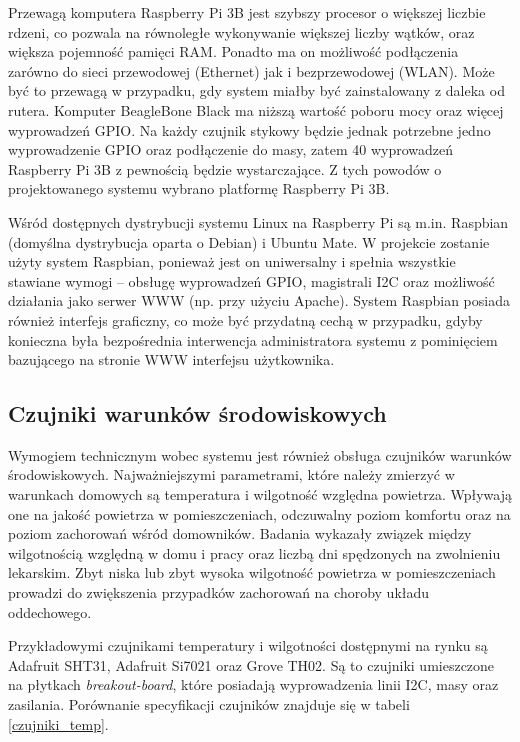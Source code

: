 \documentclass[a4paper,11pt,twoside]{article}
\begin{document}
Przewagą komputera Raspberry Pi 3B jest szybszy procesor o większej liczbie rdzeni, co pozwala na równoległe wykonywanie większej liczby wątków, oraz większa pojemność pamięci RAM. Ponadto ma on możliwość podłączenia zarówno do sieci przewodowej (Ethernet) jak i bezprzewodowej (WLAN). Może być to przewagą w przypadku, gdy system miałby być zainstalowany z daleka od rutera. Komputer BeagleBone Black ma niższą wartość poboru mocy oraz więcej wyprowadzeń GPIO. Na każdy czujnik stykowy będzie jednak potrzebne jedno wyprowadzenie GPIO oraz podłączenie do masy, zatem 40 wyprowadzeń Raspberry Pi 3B z pewnością będzie wystarczające. Z tych powodów o projektowanego systemu wybrano platformę Raspberry Pi 3B.

Wśród dostępnych dystrybucji systemu Linux na Raspberry Pi są m.in. Raspbian (domyślna dystrybucja oparta o Debian) i Ubuntu Mate. W projekcie zostanie użyty system Raspbian, ponieważ jest on uniwersalny i spełnia wszystkie stawiane wymogi -- obsługę wyprowadzeń GPIO, magistrali I2C oraz możliwość działania jako serwer WWW (np. przy użyciu Apache). System Raspbian posiada również interfejs graficzny, co może być przydatną cechą w przypadku, gdyby konieczna była bezpośrednia interwencja administratora systemu z pominięciem bazującego na stronie WWW interfejsu użytkownika.

\subsection{Czujniki warunków środowiskowych}
Wymogiem technicznym wobec systemu jest również obsługa czujników warunków środowiskowych. Najważniejszymi parametrami, które należy zmierzyć w warunkach domowych są temperatura i wilgotność względna powietrza. Wpływają one na jakość powietrza w pomieszczeniach, odczuwalny poziom komfortu oraz na poziom zachorowań wśród domowników. Badania wykazały związek między wilgotnością względną w domu i pracy oraz liczbą dni spędzonych na zwolnieniu lekarskim. Zbyt niska lub zbyt wysoka wilgotność powietrza w pomieszczeniach prowadzi do zwiększenia przypadków zachorowań na choroby układu oddechowego\cite{zachorowania}\cite{klimat}. 

Przykładowymi czujnikami temperatury i wilgotności dostępnymi na rynku są Adafruit SHT31, Adafruit Si7021 oraz Grove TH02. Są to czujniki umieszczone na płytkach \textit{breakout-board}, które posiadają wyprowadzenia linii I2C, masy oraz zasilania. Porównanie specyfikacji czujników znajduje się w tabeli \ref{czujniki_temp}.
\end{document}
